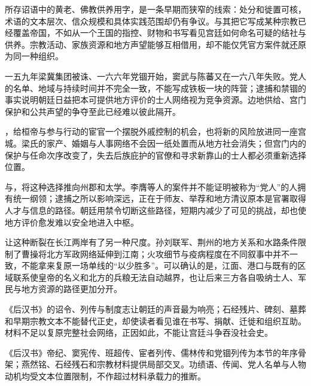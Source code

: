 所存诏语中的黄老、佛教供养用字，是一条早期而狭窄的线索：处分和徙置可核，术语的文本层次、信众规模和具体实践范围却仍有争议。与其把它写成某种宗教已经覆盖帝国，不如从一个王国的指控、财物和书写看见宫廷如何命名可疑的结社与供养。宗教活动、家族资源和地方声望能够互相借用，却不能仅凭官方案件就还原为同一种组织。

一五九年梁冀集团被诛、一六六年党锢开始，窦武与陈蕃又在一六八年失败。党人的名单、地域与持续时间并不完全一致，不能写成铁板一块的阵营；逮捕和禁锢的事实说明朝廷日益把本可提供地方评价的士人网络视为竞争资源。边地供给、宫门保护和公共声望的争夺至此已经难以彼此隔开。

，给桓帝与参与行动的宦官一个摆脱外戚控制的机会，也将新的风险放进同一座宫城。梁氏的家产、婚姻与人事网络不会因一纸处置而从地方社会消失；但宫门内的保护与任命次序改变了，失去后族庇护的官僚和寻求新靠山的士人都必须重新选择位置。

与，将这种选择推向州郡和太学。李膺等人的案件并不能证明被称为“党人”的人拥有统一纲领；逮捕之所以影响深远，正在于师友、举荐和地方清议原本是官署取得人才与信息的路径。朝廷用禁令切断这些路径，短期内减少了可见的挑战，却也使地方评价愈发难以安全地进入中枢。

让这种断裂在长江两岸有了另一种尺度。孙刘联军、荆州的地方关系和水路条件限制了曹操将北方军政网络延伸到江南；火攻细节与疫病程度在不同叙事中并不一致，不能拿来复原一场单线的“以少胜多”。可以确认的是，江面、港口与既有的区域联系使皇帝的名义和北方的兵粮无法自动越界，也让后来三方各自吸纳士人、军民与地方资源的路径更加分开。

\begin{textwindow}[权威并非只在宫门内]
《后汉书》的诏令、列传与制度志让朝廷的声音最为响亮；石经残片、碑刻、墓葬和早期宗教文本不能替代正史，却使读者看见谁在书写、捐献、迁徙和组织互助。材料不足以复原完整社会网络，正因如此，不能让宫廷斗争吞没社会史。
\end{textwindow}

\begin{sourcenote}[功绩与知识的限度]
《后汉书》帝纪、窦宪传、班超传、宦者列传、儒林传和党锢列传为本节的年序骨架；燕然铭、石经残石和宗教材料提供局部交叉。功绩语、传闻、党人名单与人物动机均受文本位置限制，不作超过材料承载力的推断。
\end{sourcenote}

